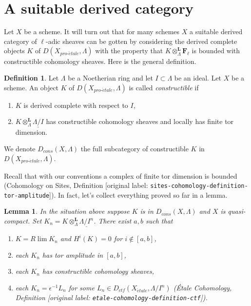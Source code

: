\documentclass[10pt,a4paper]{article}
\theoremstyle{plain}
\newtheorem{lemma}[subsection]{Lemma}
\theoremstyle{definition}
\newtheorem{definition}[subsection]{Definition}
\theoremstyle{remark}
\numberwithin{equation}{subsection}
\def\lim{\mathop{\mathrm{lim}}\nolimits}
\def\proetale{{pro\text{-}\acute{e}tale}}
\def\etale{{\acute{e}tale}}
\begin{document}
\section{A suitable derived category}
\label{section-suitable-derived}

\noindent
Let $X$ be a scheme. It will turn out that for many schemes $X$ a suitable
derived category of $\ell$-adic sheaves can be gotten by considering the
derived complete objects $K$ of $D(X_\proetale, \Lambda)$ with the property
that $K \otimes_\Lambda^\mathbf{L} \mathbf{F}_\ell$ is bounded with
constructible cohomology sheaves. Here is the general definition.

\begin{definition}
\label{definition-Dbc}
Let $\Lambda$ be a Noetherian ring and let $I \subset \Lambda$ be an ideal.
Let $X$ be a scheme. An object $K$ of $D(X_\proetale, \Lambda)$ is called
{\it constructible} if
\begin{enumerate}
\item $K$ is derived complete with respect to $I$,
\item $K \otimes_\Lambda^\mathbf{L} \underline{\Lambda/I}$
has constructible cohomology sheaves and locally has finite tor dimension.
\end{enumerate}
We denote $D_{cons}(X, \Lambda)$ the full subcategory of constructible
$K$ in $D(X_\proetale, \Lambda)$.
\end{definition}

\noindent
Recall that with our conventions a complex of finite tor dimension
is bounded (Cohomology on Sites, Definition
[original label: \nolinkurl{sites-cohomology-definition-tor-amplitude}]).
In fact, let's collect everything proved so far in a lemma.

\begin{lemma}
\label{lemma-describe-constructible-complexes}
In the situation above suppose $K$ is in $D_{cons}(X, \Lambda)$
and $X$ is quasi-compact. Set
$K_n = K \otimes_\Lambda^\mathbf{L} \underline{\Lambda/I^n}$.
There exist $a, b$ such that
\begin{enumerate}
\item $K = R\lim K_n$ and $H^i(K) = 0$ for $i \not \in [a, b]$,
\item each $K_n$ has tor amplitude in $[a, b]$,
\item each $K_n$ has constructible cohomology sheaves,
\item each $K_n = \epsilon^{-1}L_n$ for some
$L_n \in D_{ctf}(X_\etale, \Lambda/I^n)$
(\'Etale Cohomology, Definition [original label: \nolinkurl{etale-cohomology-definition-ctf}]).
\end{enumerate}
\end{lemma}
\end{document}
